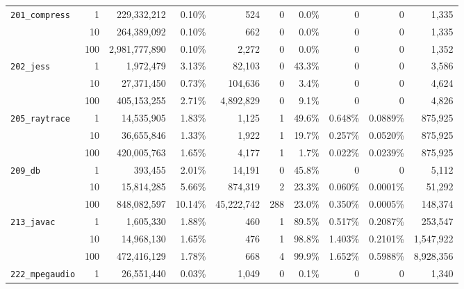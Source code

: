\documentclass[preprint]{rdbacmconf}
\begin{document}
\begin{figure*}
\begin{center}
\begin{tabular}{l@{}rrrrrrrrr}
 \hline \texttt{201\_compress } &   1 & 229,332,212 &  0.10\% &        524 &   0 &  0.0\% &     0   &      0   &     1,335 \\
                                &  10 & 264,389,092 &  0.10\% &        662 &   0 &  0.0\% &     0   &      0   &     1,335 \\
                               & 100 & 2,981,777,890 &  0.10\% &      2,272 &   0 &  0.0\% &     0   &      0   &     1,352 \\
 \hline \texttt{202\_jess     } &   1 &   1,972,479 &  3.13\% &     82,103 &   0 & 43.3\% &     0   &      0   &     3,586 \\
                                &  10 &  27,371,450 &  0.73\% &    104,636 &   0 &  3.4\% &     0   &      0   &     4,624 \\
                                & 100 & 405,153,255 &  2.71\% &  4,892,829 &   0 &  9.1\% &     0   &      0   &     4,826 \\
 \hline \texttt{205\_raytrace } &   1 &  14,535,905 &  1.83\% &      1,125 &   1 & 49.6\% & 0.648\% & 0.0889\% &   875,925 \\
                                &  10 &  36,655,846 &  1.33\% &      1,922 &   1 & 19.7\% & 0.257\% & 0.0520\% &   875,925 \\
                                & 100 & 420,005,763 &  1.65\% &      4,177 &   1 &  1.7\% & 0.022\% & 0.0239\% &   875,925 \\
 \hline \texttt{209\_db       } &   1 &     393,455 &  2.01\% &     14,191 &   0 & 45.8\% &     0   &      0   &     5,112 \\
                                &  10 &  15,814,285 &  5.66\% &    874,319 &   2 & 23.3\% & 0.060\% & 0.0001\% &    51,292 \\
                                & 100 & 848,082,597 & 10.14\% & 45,222,742 & 288 & 23.0\% & 0.350\% & 0.0005\% &   148,374 \\
 \hline \texttt{213\_javac    } &   1 &   1,605,330 &  1.88\% &        460 &   1 & 89.5\% & 0.517\% & 0.2087\% &   253,547 \\
                                &  10 &  14,968,130 &  1.65\% &        476 &   1 & 98.8\% & 1.403\% & 0.2101\% & 1,547,922 \\
                                & 100 & 472,416,129 &  1.78\% &        668 &   4 & 99.9\% & 1.652\% & 0.5988\% & 8,928,356 \\
 \hline \texttt{222\_mpegaudio} &   1 &  26,551,440 &  0.03\% &      1,049 &   0 &  0.1\% &     0   &      0   &     1,340 \\

\end{tabular}
\end{center}
\end{figure*}
\end{document}
